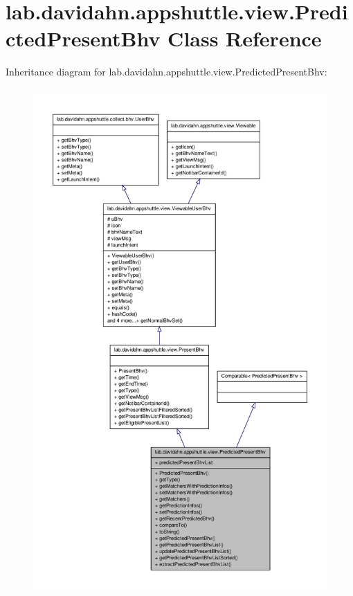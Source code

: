 \hypertarget{classlab_1_1davidahn_1_1appshuttle_1_1view_1_1_predicted_present_bhv}{\section{lab.\-davidahn.\-appshuttle.\-view.\-Predicted\-Present\-Bhv \-Class \-Reference}
\label{classlab_1_1davidahn_1_1appshuttle_1_1view_1_1_predicted_present_bhv}
}


\-Inheritance diagram for lab.\-davidahn.\-appshuttle.\-view.\-Predicted\-Present\-Bhv\-:
\nopagebreak
\begin{figure}[H]
\begin{center}
\leavevmode
\includegraphics[height=550pt]{classlab_1_1davidahn_1_1appshuttle_1_1view_1_1_predicted_present_bhv__inherit__graph}
\end{center}
\end{figure}


